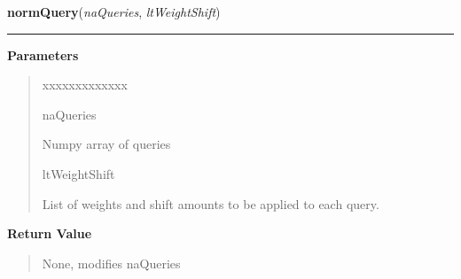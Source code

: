     \label{QSTK:qstkfeat:featutil:normQuery}

    \vspace{0.5ex}

\hspace{.8\funcindent}\begin{boxedminipage}{\funcwidth}

    \raggedright \textbf{normQuery}(\textit{naQueries}, \textit{ltWeightShift})

    \vspace{-1.5ex}

    \rule{\textwidth}{0.5\fboxrule}
\setlength{\parskip}{2ex}
\setlength{\parskip}{1ex}
      \textbf{Parameters}
      \vspace{-1ex}

      \begin{quote}
        \begin{Ventry}{xxxxxxxxxxxxx}

          \item[naQueries]

          Numpy array of queries

          \item[ltWeightShift]

          List of weights and shift amounts to be applied to each query.

        \end{Ventry}

      \end{quote}

      \textbf{Return Value}
    \vspace{-1ex}

      \begin{quote}
      None, modifies naQueries

      \end{quote}

    \end{boxedminipage}

    \label{QSTK:qstkfeat:featutil:createKnnLearner}

    \vspace{0.5ex}

